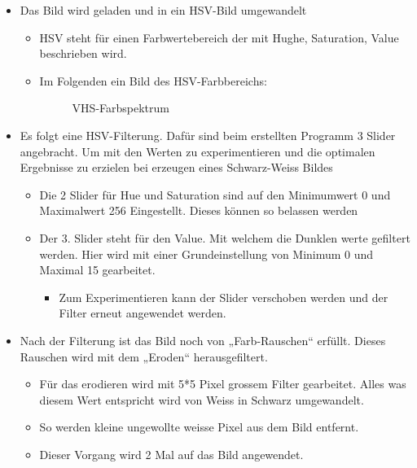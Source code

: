 \begin{itemize}
    \item Das Bild wird geladen und in ein HSV-Bild umgewandelt
    \begin{itemize}
        \item HSV steht für einen Farbwertebereich der mit Hughe, Saturation, 
            Value beschrieben wird.
        \item Im Folgenden ein Bild des HSV-Farbbereichs:\\
        \begin{figure}[!h]
            \centering
            \caption{VHS-Farbspektrum}
            \label{fig:HSV-Farbspektrum}
        \end{figure}
    \end{itemize}
    \item Es folgt eine HSV-Filterung. Dafür sind beim erstellten Programm 3 
        Slider angebracht. Um mit den Werten zu experimentieren und die 
        optimalen Ergebnisse zu erzielen bei erzeugen eines Schwarz-Weiss Bildes
    \begin{itemize}
        \item Die 2 Slider für Hue und Saturation sind auf den Minimumwert 0 
            und Maximalwert 256 Eingestellt. Dieses können so belassen werden
        \item Der 3. Slider steht für den Value. Mit welchem die Dunklen werte 
            gefiltert werden. Hier wird mit einer Grundeinstellung von Minimum 
            0 und Maximal 15 gearbeitet.
        \begin{itemize}
            \item Zum Experimentieren kann der Slider verschoben werden und 
                der Filter erneut angewendet werden.
        \end{itemize}
    \end{itemize}
    \item Nach der Filterung ist das Bild noch von „Farb-Rauschen“ erfüllt. 
        Dieses Rauschen wird mit dem „Eroden“ herausgefiltert.
    \begin{itemize}
        \item Für das erodieren wird mit 5*5 Pixel grossem Filter gearbeitet. 
            Alles was diesem Wert entspricht wird von Weiss in Schwarz 
            umgewandelt.
        \item So werden kleine ungewollte weisse Pixel aus dem Bild entfernt.
        \item Dieser Vorgang wird 2 Mal auf das Bild angewendet.

\end{itemize}
\end{itemize}
